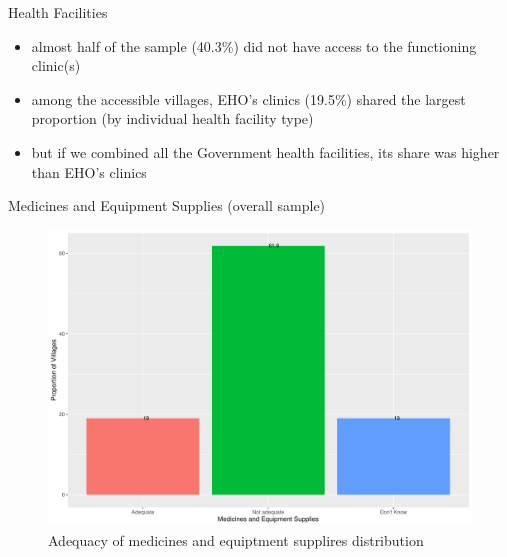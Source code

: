 \documentclass[
  ignorenonframetext,
]{beamer}
\providecommand{\tightlist}{%
  \setlength{\itemsep}{0pt}\setlength{\parskip}{0pt}}
\begin{document}
\begin{frame}{Health Facilities}
\protect\hypertarget{health-facilities}{}
\begin{itemize}
\tightlist
\item
  almost half of the sample (40.3\%) did not have access to the
  functioning clinic(s)
\item
  among the accessible villages, EHO's clinics (19.5\%) shared the
  largest proportion (by individual health facility type)
\item
  but if we combined all the Government health facilities, its share was
  higher than EHO's clinics
\end{itemize}
\end{frame}

\begin{frame}{Medicines and Equipment Supplies (overall sample)}
\protect\hypertarget{equiptment}{}
\begin{figure}
\includegraphics[width=1\linewidth]{example_plots_files/figure-beamer/unnamed-chunk-5-1} \caption{Adequacy of medicines and equiptment supplires distribution}\label{fig:unnamed-chunk-5}
\end{figure}
\end{frame}
\end{document}
